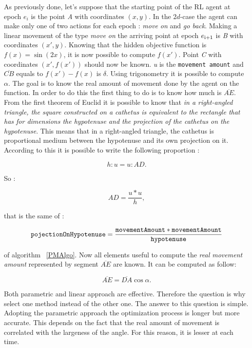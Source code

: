 As previously done, let's suppose that the starting point of the RL agent at epoch $e_i$ is the point \textit{A} with coordinates $(x, y)$. In the $2d$-case the agent can make only one of two actions for each epoch : \textit{move on} and \textit{go back}. Making a linear movement of the type \textit{move on} the arriving point at epoch $e\textsubscript{i+1}$ is \textit{B} with coordinates $(x', y)$. Knowing that the hidden objective function is $f(x) = \sin(2x)$, it is now possible to compute $f(x')$. Point \textit{C} with coordinates $(x', f(x'))$ should now be known. \textit{u} is the {\tt movement amount} and $\overline{CB}$  equals to $f(x') - f(x)$ is $\delta$. Using trigonometry it is possible to compute $\alpha$. The goal is to know the real amount of movement done by the agent on the function. In order to do this the first thing to do is to know how much is $\overline{AE}$.  From the first theorem of Euclid it is possible to know that \textit{in a right-angled triangle, the square constructed on a cathetus is equivalent to the rectangle that has for dimensions the hypotenuse and the projection of the cathetus on the hypotenuse}. This means that in a right-angled triangle, the cathetus is proportional medium between the hypotenuse and its own projection on it. According to this it is possible to write the following proportion :

\begin{equation}
	h : u =  u : AD.
\end{equation}

So :

\begin{equation}
	AD = \dfrac{u * u}{h},
\end{equation}

that is the same of :

\begin{equation}
	 {\tt pojectionOnHypotenuse} = \dfrac{{\tt movementAmount} * {\tt movementAmount}}{{\tt hypotenuse}}
\end{equation}

of algorithm ~\ref{PMAlgo}. Now all elements useful to compute the \textit{real movement amount} represented by segment $\overline{AE}$ are known. It can be computed as follow:

\begin{equation}
	\overline{AE} = \overline{DA} \cos \alpha.
\end{equation}

Both parametric and linear approach are effective. Therefore the question is why select one method instead of the other one. The answer to this question is simple. Adopting the parametric approach the optimization process is longer but more accurate. This depends on the fact that the real amount of movement is correlated with the largeness of the angle. For this reason, it is lesser at each time. \\

